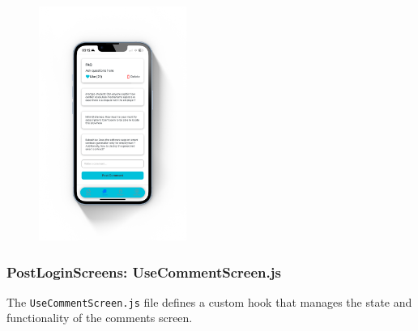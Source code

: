 \begin{figure}[!ht]
    \centering
    \includegraphics[width=0.43\textwidth]
    {LATEX/Appendices/Images/Software/Frontend/comments_screen.png}
    \label{fig:comment screen}
\end{figure}

\subsubsection{PostLoginScreens: UseCommentScreen.js}

The \texttt{UseCommentScreen.js} file defines a custom hook that manages the state and functionality of the comments screen.

